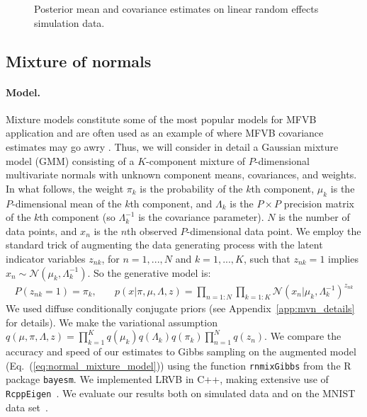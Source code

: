 \documentclass{article}\usepackage[]{graphicx}\usepackage[]{color}
\newenvironment{knitrout}{}{} %
\newcommand{\app}[1]{Appendix~\ref{app:#1}}
\newcommand{\eq}[1]{Eq.~(\ref{eq:#1})}
\newcommand{\gauss}{\mathcal{N}} %
\begin{document}
\begin{knitrout}
\begin{figure}[ht!]
{}

\caption[Posterior mean and covariance estimates on linear random effects simulation data]{Posterior mean and covariance estimates on linear random effects simulation data.}\label{fig:RE_SimulationResults}
\end{figure}


\end{knitrout}
\subsection{Mixture of normals} \label{sec:normal_mixture_model}
\paragraph{Model.}
%
Mixture models constitute some of the most popular models for MFVB application
\citep{blei:2003:lda, blei:2006:dp} and are often used as an example of where
MFVB covariance estimates may go awry \citep{bishop:2006:pattern,
turner:2011:two}. Thus, we will consider in detail a Gaussian mixture model
(GMM) consisting of a $K$-component mixture of $P$-dimensional multivariate
normals with unknown component means, covariances, and weights. In what follows,
the weight $\pi_k$ is the probability of the $k$th component, $\mu_k$ is the
$P$-dimensional mean of the $k$th component, and $\Lambda_k$ is the $P \times P$
precision matrix of the $k$th component (so $\Lambda_k^{-1}$ is the covariance
parameter).  $N$ is the number of data points, and $x_{n}$ is the $n$th observed
$P$-dimensional data point. We employ the standard trick of augmenting the data
generating process with the latent indicator variables $z_{nk}$, for $n=1,...,N$
and $k=1,...,K$, such that $z_{nk} = 1$ implies $x_{n} \sim \gauss(\mu_k,
\Lambda^{-1}_k)$. So the generative model is:
%
\begin{align}
P(z_{nk} = 1) = \pi_k, & \quad
p(x | \pi, \mu, \Lambda, z) =
    \prod_{n=1:N} \prod_{k=1:K} \gauss(x_n | \mu_k, \Lambda^{-1}_k)^{z_{nk}}
    \label{eq:normal_mixture_model}
\end{align}
%
We used diffuse conditionally conjugate priors (see \app{mvn_details} for
details). We make the variational assumption $q\left(\mu, \pi, \Lambda, z\right) =
\prod_{k=1}^K
q\left(\mu_k\right)q\left(\Lambda_k\right)q\left(\pi_k\right)\prod_{n=1}^N
q\left(z_{n}\right)$. We compare the accuracy and speed of our estimates to
Gibbs sampling on the augmented model (\eq{normal_mixture_model}) using the
function \texttt{rnmixGibbs} from the R package \texttt{bayesm}.  We implemented
LRVB in C++, making extensive use of
\texttt{RcppEigen}~\citep{rpackage:RcppEigen}. We evaluate our results both on
simulated data and on the MNIST data set~\citep{mnist:lecun1998gradient}.
%
\end{document}
